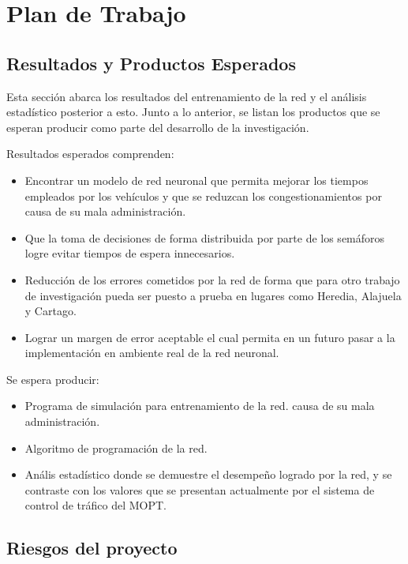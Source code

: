 \chapter{Plan de Trabajo}
	\label{chap:work}
	
	\section{Resultados y Productos Esperados}
	
	Esta secci\'{o}n abarca los resultados del entrenamiento de la red y el
an\'{a}lisis estad\'{i}stico posterior a esto. Junto a lo anterior, se listan
los productos que se esperan producir como parte del desarrollo de la
investigaci\'{o}n.
	
Resultados esperados comprenden:
	\begin{itemize}
	  \item Encontrar un modelo de red neuronal que permita mejorar los tiempos
	  empleados por los veh\'{i}culos y que se reduzcan los congestionamientos por
	  causa de su mala administraci\'{o}n.
	  \item Que la toma de decisiones de forma distribuida por parte de los
	  sem\'{a}foros logre evitar tiempos de espera innecesarios. 
	  \item Reducci\'{o}n de los errores cometidos por la red de forma que para
	  otro trabajo de investigaci\'{o}n pueda ser puesto a prueba en lugares como
	  Heredia, Alajuela y Cartago.
	  \item Lograr un margen de error aceptable el cual permita en un futuro pasar
	  a la implementaci\'{o}n en ambiente real de la red neuronal.
	\end{itemize}

Se espera producir:
	\begin{itemize}
	  \item Programa de simulaci\'{o}n para entrenamiento de la red.
	  causa de su mala administraci\'{o}n.
	  \item Algoritmo de programaci\'{o}n de la red.
	  \item An\'{a}lis estad\'{i}stico donde se demuestre el desempe\~{n}o logrado
	  por la red, y se contraste con los valores que se presentan actualmente por
	  el sistema de control de tr\'{a}fico del MOPT.
	\end{itemize}
	
	\section{Riesgos del proyecto}
	

